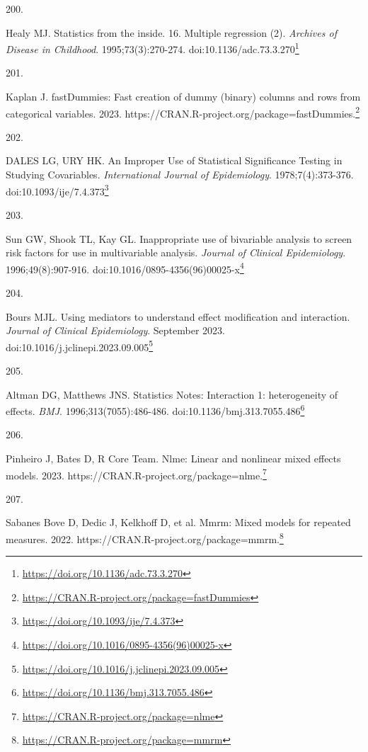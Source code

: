 \documentclass[
  a4paper,
]{book}
\newlength{\cslhangindent}
\newlength{\csllabelwidth}
\newlength{\cslentryspacingunit} %
\newenvironment{CSLReferences}[2] %
 {%
  \setlength{\parindent}{0pt}
  \ifodd #1
  \let\oldpar\par
  \def\par{\hangindent=\cslhangindent\oldpar}
  \fi
  \setlength{\parskip}{#2\cslentryspacingunit}
 }%
 {}
\newcommand{\CSLLeftMargin}[1]{\parbox[t]{\csllabelwidth}{#1}}
\newcommand{\CSLRightInline}[1]{\parbox[t]{\linewidth - \csllabelwidth}{#1}\break}
\renewcommand{\href}[2]{#2\footnote{\url{#1}}}
\begin{document}
\begin{CSLReferences}{0}{0}
\leavevmode{}%
\CSLLeftMargin{200. }%
\CSLRightInline{Healy MJ. Statistics from the inside. 16. Multiple regression (2). \emph{Archives of Disease in Childhood}. 1995;73(3):270-274. doi:\href{https://doi.org/10.1136/adc.73.3.270}{10.1136/adc.73.3.270}}

\leavevmode{}%
\CSLLeftMargin{201. }%
\CSLRightInline{Kaplan J. fastDummies: Fast creation of dummy (binary) columns and rows from categorical variables. 2023. \href{https://CRAN.R-project.org/package=fastDummies}{https://CRAN.R-project.org/package=fastDummies.}}

\leavevmode{}%
\CSLLeftMargin{202. }%
\CSLRightInline{DALES LG, URY HK. An Improper Use of Statistical Significance Testing in Studying Covariables. \emph{International Journal of Epidemiology}. 1978;7(4):373-376. doi:\href{https://doi.org/10.1093/ije/7.4.373}{10.1093/ije/7.4.373}}

\leavevmode{}%
\CSLLeftMargin{203. }%
\CSLRightInline{Sun GW, Shook TL, Kay GL. Inappropriate use of bivariable analysis to screen risk factors for use in multivariable analysis. \emph{Journal of Clinical Epidemiology}. 1996;49(8):907-916. doi:\href{https://doi.org/10.1016/0895-4356(96)00025-x}{10.1016/0895-4356(96)00025-x}}

\leavevmode{}%
\CSLLeftMargin{204. }%
\CSLRightInline{Bours MJL. Using mediators to understand effect modification and interaction. \emph{Journal of Clinical Epidemiology}. September 2023. doi:\href{https://doi.org/10.1016/j.jclinepi.2023.09.005}{10.1016/j.jclinepi.2023.09.005}}

\leavevmode{}%
\CSLLeftMargin{205. }%
\CSLRightInline{Altman DG, Matthews JNS. Statistics Notes: Interaction 1: heterogeneity of effects. \emph{BMJ}. 1996;313(7055):486-486. doi:\href{https://doi.org/10.1136/bmj.313.7055.486}{10.1136/bmj.313.7055.486}}

\leavevmode{}%
\CSLLeftMargin{206. }%
\CSLRightInline{Pinheiro J, Bates D, R Core Team. Nlme: Linear and nonlinear mixed effects models. 2023. \href{https://CRAN.R-project.org/package=nlme}{https://CRAN.R-project.org/package=nlme.}}

\leavevmode{}%
\CSLLeftMargin{207. }%
\CSLRightInline{Sabanes Bove D, Dedic J, Kelkhoff D, et al. Mmrm: Mixed models for repeated measures. 2022. \href{https://CRAN.R-project.org/package=mmrm}{https://CRAN.R-project.org/package=mmrm.}}


\end{CSLReferences}
\end{document}
